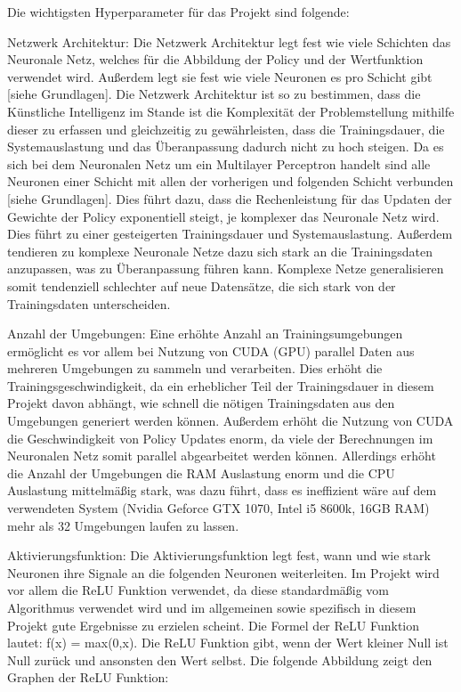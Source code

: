 Die wichtigsten Hyperparameter für das Projekt sind folgende:

Netzwerk Architektur: Die Netzwerk Architektur legt fest wie viele Schichten das Neuronale Netz, welches für die Abbildung der Policy und der Wertfunktion verwendet wird. Außerdem legt sie fest wie viele Neuronen es pro Schicht gibt [siehe Grundlagen]. Die Netzwerk Architektur ist so zu bestimmen, dass die Künstliche Intelligenz im Stande ist die Komplexität der Problemstellung mithilfe dieser zu erfassen und gleichzeitig zu gewährleisten, dass die Trainingsdauer, die Systemauslastung und das Überanpassung dadurch nicht zu hoch steigen. Da es sich bei dem Neuronalen Netz um ein Multilayer Perceptron handelt sind alle Neuronen einer Schicht mit allen der vorherigen und folgenden Schicht verbunden [siehe Grundlagen]. Dies führt dazu, dass die Rechenleistung für das Updaten der Gewichte der Policy exponentiell steigt, je komplexer das Neuronale Netz wird. Dies führt zu einer gesteigerten Trainingsdauer und Systemauslastung. Außerdem tendieren zu komplexe Neuronale Netze dazu sich stark an die Trainingsdaten anzupassen, was zu Überanpassung führen kann. Komplexe Netze generalisieren somit tendenziell schlechter auf neue Datensätze, die sich stark von der Trainingsdaten unterscheiden.

Anzahl der Umgebungen: Eine erhöhte Anzahl an Trainingsumgebungen ermöglicht es vor allem bei Nutzung von CUDA (GPU) parallel Daten aus mehreren Umgebungen zu sammeln und verarbeiten. Dies erhöht die Trainingsgeschwindigkeit, da ein erheblicher Teil der Trainingsdauer in diesem Projekt davon abhängt, wie schnell die nötigen Trainingsdaten aus den Umgebungen generiert werden können. Außerdem erhöht die Nutzung von CUDA die Geschwindigkeit von Policy Updates enorm, da viele der Berechnungen im Neuronalen Netz somit parallel abgearbeitet werden können. Allerdings erhöht die Anzahl der Umgebungen die RAM Auslastung enorm und die CPU Auslastung mittelmäßig stark, was dazu führt, dass es ineffizient wäre auf dem verwendeten System (Nvidia Geforce GTX 1070, Intel i5 8600k, 16GB RAM) mehr als 32 Umgebungen laufen zu lassen.

Aktivierungsfunktion: Die Aktivierungsfunktion legt fest, wann und wie stark Neuronen ihre Signale an die folgenden Neuronen weiterleiten. Im Projekt wird vor allem die ReLU Funktion verwendet, da diese standardmäßig vom Algorithmus verwendet wird und im allgemeinen sowie spezifisch in diesem Projekt gute Ergebnisse zu erzielen scheint. Die Formel der ReLU Funktion lautet: f(x) = max(0,x). Die ReLU Funktion gibt, wenn der Wert kleiner Null ist Null zurück und ansonsten den Wert selbst. Die folgende Abbildung zeigt den Graphen der ReLU Funktion:\\

